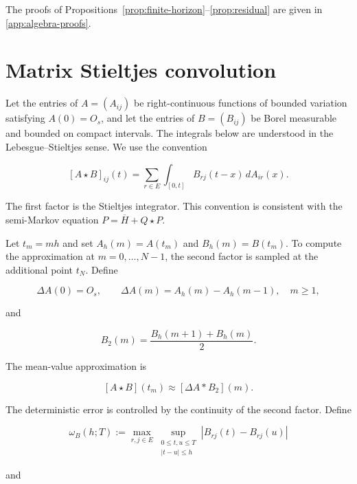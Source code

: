 \documentclass[3p,12pt,authoryear]{elsarticle}
\theoremstyle{definition}
\theoremstyle{remark}
\begin{document}
The proofs of Propositions~\ref{prop:finite-horizon}--\ref{prop:residual} are given in \ref{app:algebra-proofs}.

\section{Matrix Stieltjes convolution}\label{sec:stieltjes}

Let the entries of $A=(A_{ij})$ be right-continuous functions of bounded variation satisfying $A(0)=O_s$, and let the entries of $B=(B_{ij})$ be Borel measurable and bounded on compact intervals. The integrals below are understood in the Lebesgue--Stieltjes sense. We use the convention

\begin{equation}\label{eq:stieltjes}
[A\star B]_{ij}(t)
=
\sum_{r\in E}\int_{[0,t]}B_{rj}(t-x)\,dA_{ir}(x).
\end{equation}

The first factor is the Stieltjes integrator. This convention is consistent with the semi-Markov equation $P=\overline H+Q\star P$.

Let $t_m=mh$ and set $A_h(m)=A(t_m)$ and $B_h(m)=B(t_m)$. To compute the approximation at $m=0,\ldots,N-1$, the second factor is sampled at the additional point $t_N$. Define

\begin{equation*}
\Delta A(0)=O_s,
\qquad
\Delta A(m)=A_h(m)-A_h(m-1),
\quad m\geq1,
\end{equation*}

and

\begin{equation*}
B_2(m)=\frac{B_h(m+1)+B_h(m)}{2}.
\end{equation*}

The mean-value approximation is

\begin{equation}\label{eq:stieltjes-discrete}
[A\star B](t_m)
\approx
[\Delta A*B_2](m).
\end{equation}


The deterministic error is controlled by the continuity of the second factor. Define

\begin{equation*}
\omega_B(h;T)
:=
\max_{r,j\in E}
\sup_{\substack{0\leq t,u\leq T\\ |t-u|\leq h}}
|B_{rj}(t)-B_{rj}(u)|
\end{equation*}

and
\end{document}
